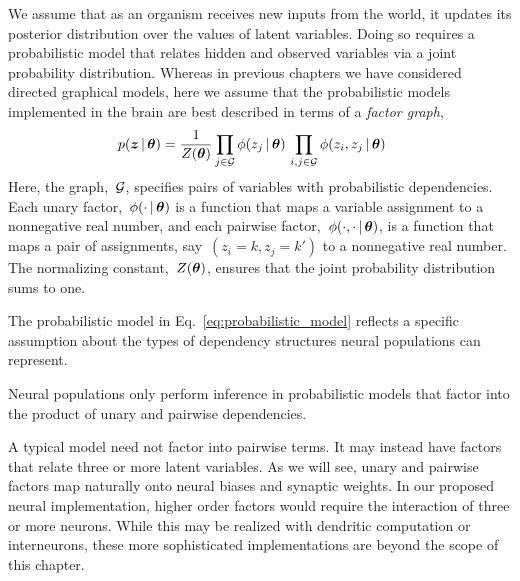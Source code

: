 We assume that as an organism receives new inputs from the world, it
updates its posterior distribution over the values of latent
variables. Doing so requires a probabilistic model that relates hidden
and observed variables via a joint probability distribution.  Whereas
in previous chapters we have considered directed graphical models,
here we assume that the probabilistic models implemented in the brain
are best described in terms of a \emph{factor graph},
\begin{align}
  \label{eq:probabilistic_model}
  p(\boldsymbol{z} \,|\, \boldsymbol{\theta}) &=
  \frac{1}{Z(\boldsymbol{\theta})}
  \prod_{j \in \mathcal{G}} \phi(z_j \,|\, \boldsymbol{\theta}) \,
  \prod_{i,j \in \mathcal{G}} \phi(z_i, z_j \,|\, \boldsymbol{\theta}) \,
\end{align}
Here, the graph,~$\mathcal{G}$, specifies pairs of variables with
probabilistic dependencies.  Each unary factor,~$\phi(\cdot \,|\,
\boldsymbol{\theta})$ is a function that maps a variable assignment to a
nonnegative real number, and each pairwise factor,~$\phi(\cdot, \cdot
\,|\, \boldsymbol{\theta})$, is a function that maps a pair of assignments,
say~${(z_i=k, z_j=k')}$ to a nonnegative real number. The
normalizing constant,~$Z(\boldsymbol{\theta})$, ensures that the joint probability
distribution sums to one.

The probabilistic model in Eq.~\ref{eq:probabilistic_model} reflects
a specific assumption about the types of dependency structures
neural populations can represent.

\begin{assumption}
  Neural populations only perform inference in probabilistic models
  that factor into the product of unary and pairwise dependencies. 
\end{assumption}

A typical model need not factor into pairwise terms. It may instead
have factors that relate three or more latent variables. As we will
see, unary and pairwise factors map naturally onto neural biases
and synaptic weights. In our proposed neural implementation, higher
order factors would require the interaction of three or more neurons.
While this may be realized with dendritic computation or interneurons,
these more sophisticated implementations are beyond the scope of this
chapter. 

